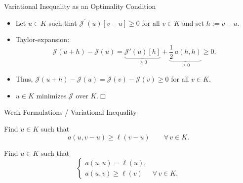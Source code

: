 \documentclass[10pt,aspectratio=169]{beamer}
\def\cJ{{\mathcal J}}
\def\eop{\hfill{$\Box$}}
\begin{document}
\begin{frame}{Variational Inequality as an Optimality Condition}
	\begin{itemize}
		\item Let $u\in K$ such that  $\cJ^\prime(u)[v-u]\ge 0$ for all $v\in K$ and set $h:= v-u$.
		\item Taylor-expansion:
		      \begin{equation*}
			      \cJ(u+h)-\cJ(u)=\underbrace{\cJ'(u)[h]}_{\ge 0}+\underbrace{\frac12\,a(h,h)}_{\ge 0} \ge 0.
		      \end{equation*}
		\item Thus, $\cJ(u+h)-\cJ(u) = \cJ(v)-\cJ(v)\ge 0$ for all $v\in K$.
		\item $u\in K$ minimizes $\cJ$ over $K$.\eop
	\end{itemize}
\end{frame}

\begin{frame}{Weak Formulations / Variational Inequality}
	\begin{problem}
	Find $u\in K$ such that
	\begin{equation*}
		a(u,v-u)\ge \ell(v-u)\qquad \forall\, v\in K.
	\end{equation*}
	\end{problem}

	\begin{problem}
	Find $u\in K$ such that
	\begin{equation*}
		\begin{cases}
			a(u,u) = \ell(u), &                   \\[2pt]
			a(u,v)\ge \ell(v) & \forall\, v\in K.
		\end{cases}
	\end{equation*}
	\end{problem}
\end{frame}
\end{document}
